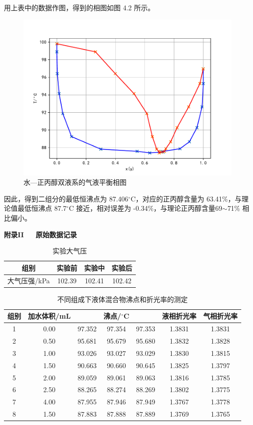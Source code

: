 \documentclass[12pt]{ctexart}
\numberwithin{equation}{section}
\begin{document}
用上表中的数据作图，得到的相图如图 4.2 所示。
\begin{figure}[!h]
    \centering
    \includegraphics[scale=1.0]{xiangtu.pdf}
    \caption{水—正丙醇双液系的气液平衡相图}
\end{figure}

因此，得到二组分的最低恒沸点为 87.406$^\circ$C，对应的正丙醇含量为
63.41\%，与理论值最低恒沸点 87.7$^\circ$C 接近，相对误差为
-0.34\%，与理论正丙醇含量69$\sim$71\% 相比偏小。

\newpage
\begin{center}
    \Large\bfseries{附录II~~~原始数据记录}
\end{center}

\begin{longtable}{cccc}
    \caption{实验大气压} \\
    \hline
    组别 & 实验前 & 实验中 & 实验后 \\
    \hline
    大气压强/kPa & 102.39 & 102.41 & 102.42 \\
    \hline
\end{longtable}

\newpage
\begin{longtable}{ccccccc}
    \caption{不同组成下液体混合物沸点和折光率的测定} \\
    \hline
    组别 & 加水体积/mL & & 沸点/$^\circ$C & & 液相折光率 & 气相折光率 \\
    \hline
    1 & 0.00 & 97.352 & 97.354 & 97.353 & 1.3831 & 1.3831 \\
    2 & 0.50 & 95.681 & 95.679 & 95.680 & 1.3832 & 1.3828 \\
    3 & 1.00 & 93.026 & 93.027 & 93.029 & 1.3830 & 1.3815 \\
    4 & 1.50 & 90.663 & 90.660 & 90.645 & 1.3825 & 1.3797 \\
    5 & 2.00 & 89.059 & 89.061 & 89.063 & 1.3816 & 1.3785 \\
    6 & 2.50 & 88.265 & 88.274 & 88.269 & 1.3802 & 1.3775 \\
    7 & 4.00 & 87.955 & 87.946 & 87.949 & 1.3767 & 1.3778 \\
    8 & 1.50 & 87.883 & 87.888 & 87.889 & 1.3769 & 1.3765 \\
    \hline
\end{longtable}
\end{document}
